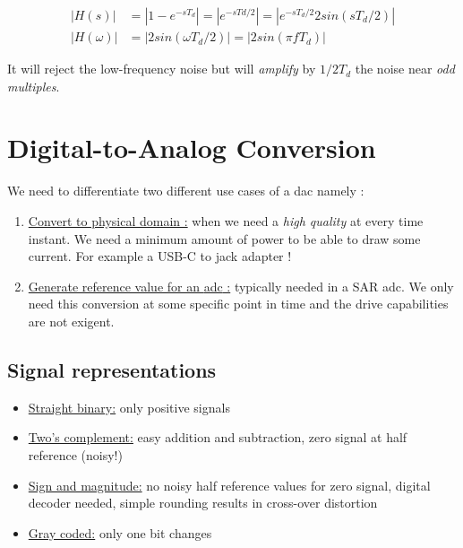 \documentclass[
  a4paper,
]{article}
\begin{document}
\[\begin{aligned}
    |H(s)| &= |1 - e^{-sT_d}| = |e^{-sTd/2}| = |e^{-sT_d /2} 2 sin(sT_d /2) |\\
    |H(\omega)| &= |2sin(\omega T_d / 2)| = |2 sin(\pi f T_d)|
\end{aligned}\]

It will reject the low-frequency noise but will \emph{amplify} by
\(1/2T_d\) the noise near \emph{odd multiples}.

\hypertarget{digital-to-analog-conversion}{%
\section{Digital-to-Analog
Conversion}\label{digital-to-analog-conversion}}

We need to differentiate two different use cases of a {dac} namely :

\begin{enumerate}
\def\labelenumi{\arabic{enumi}.}
\item
  \ul{Convert to physical domain :} when we need a \emph{high quality}
  at every time instant. We need a minimum amount of power to be able to
  draw some current. For example a USB-C to jack adapter !
\item
  \ul{Generate reference value for an {adc} :} typically needed in a SAR
  {adc}. We only need this conversion at some specific point in time and
  the drive capabilities are not exigent.
\end{enumerate}

\hypertarget{signal-representations}{%
\subsection{Signal representations}\label{signal-representations}}

\begin{itemize}
\item
  \ul{Straight binary:} only positive signals
\item
  \ul{Two's complement:} easy addition and subtraction, zero signal at
  half reference (noisy!)
\item
  \ul{Sign and magnitude:} no noisy half reference values for zero
  signal, digital decoder needed, simple rounding results in cross-over
  distortion
\item
  \ul{Gray coded:} only one bit changes
\end{itemize}
\end{document}
